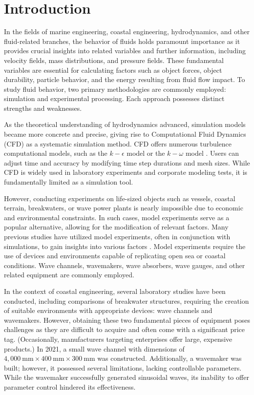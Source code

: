 \section{Introduction}




In the fields of marine engineering, coastal engineering, hydrodynamics, and other fluid-related branches, the behavior of fluids holds paramount importance as it provides crucial insights into related variables and further information, including velocity fields, mass distributions, and pressure fields. These fundamental variables are essential for calculating factors such as object forces, object durability, particle behavior, and the energy resulting from fluid flow impact. To study fluid behavior, two primary methodologies are commonly employed: simulation and experimental processing. Each approach possesses distinct strengths and weaknesses.

As the theoretical understanding of hydrodynamics advanced, simulation models became more concrete and precise, giving rise to Computational Fluid Dynamics (CFD) as a systematic simulation method. CFD offers numerous turbulence computational models, such as the $k-\epsilon$ model or the $k-\omega$ model \cite{sodja2007turbulence}. Users can adjust time and accuracy by modifying time step durations and mesh sizes. While CFD is widely used in laboratory experiments and corporate modeling tests, it is fundamentally limited as a simulation tool.

However, conducting experiments on life-sized objects such as vessels, coastal terrain, breakwaters, or wave power plants is nearly impossible due to economic and environmental constraints. In such cases, model experiments serve as a popular alternative, allowing for the modification of relevant factors. Many previous studies have utilized model experiments, often in conjunction with simulations, to gain insights into various factors \cite{izquierdo2019experimental}. Model experiments require the use of devices and environments capable of replicating open sea or coastal conditions. Wave channels, wavemakers, wave absorbers, wave gauges, and other related equipment are commonly employed.

In the context of coastal engineering, several laboratory studies have been conducted, including comparisons of breakwater structures, requiring the creation of suitable environments with appropriate devices: wave channels and wavemakers. However, obtaining these two fundamental pieces of equipment poses challenges as they are difficult to acquire and often come with a significant price tag. (Occasionally, manufacturers targeting enterprises offer large, expensive products.) In 2021, a small wave channel with dimensions of $4,000\mathrm{~mm} \times 400\mathrm{~mm} \times 300\mathrm{~mm}$ was constructed. Additionally, a wavemaker was built; however, it possessed several limitations, lacking controllable parameters. While the wavemaker successfully generated sinusoidal waves, its inability to offer parameter control hindered its effectiveness.

